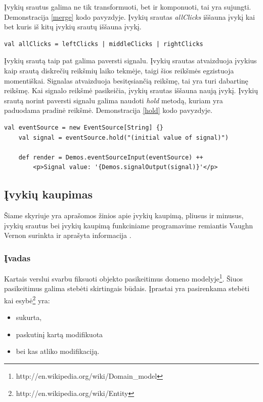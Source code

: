 Įvykių srautus galima ne tik transformuoti, bet ir komponuoti, tai yra sujungti. Demonstracija \ref{merge} kodo pavyzdyje. Įvykių srautas \textit{allClicks} iššauna įvykį kai bet kuris iš kitų įvykių srautų iššauna įvykį.

\begin{lstlisting}[caption=- įvykių srautų sujungimas, label=merge]
	val allClicks = leftClicks | middleClicks | rightClicks
\end{lstlisting}

Įvykių srautą taip pat galima paversti signalu. Įvykių srautas atvaizduoja įvykius kaip srautą diskrečių reikšmių laiko tekmėje, taigi šios reikšmės egzistuoja momentiškai. Signalas atvaizduoja besitęsiančią reikšmę, tai yra turi dabartinę reikšmę. Kai signalo reikšmė pasikeičia, įvykių srautas iššauna naują įvykį. Įvykių srautą norint paversti signalu galima naudoti \textit{hold} metodą, kuriam yra paduodama pradinė reikšmė. Demonstracija \ref{hold} kodo pavyzdyje.

\begin{lstlisting}[caption=- įvykių srautų pavertimas signalu, label=hold]
	val eventSource = new EventSource[String] {}
  	val signal = eventSource.hold("(initial value of signal)")
  
  	def render = Demos.eventSourceInput(eventSource) ++
    	<p>Signal value: '{Demos.signalOutput(signal)}'</p>
\end{lstlisting}

\subsection{Įvykių kaupimas}

Šiame skyriuje yra aprašomos žinios apie įvykių kaupimą, pliusus ir minusus, įvykių srautus bei įvykių kaupimą funkciniame programavime remiantis Vaughn Vernon surinkta ir aprašyta informacija \cite{vernon2013implementing}.

\subsubsection{Įvadas}

Kartais verslui svarbu fiksuoti objekto pasikeitimus domeno modelyje\footnote{http://en.wikipedia.org/wiki/Domain\_model}. Šiuos pasikeitimus galima stebėti skirtingais būdais. Įprastai yra pasirenkama stebėti kai esybė\footnote{http://en.wikipedia.org/wiki/Entity} yra:

\begin{itemize}

	\item sukurta,

	\item paskutinį kartą modifikuota

	\item bei kas atliko modifikaciją.

\end{itemize}

